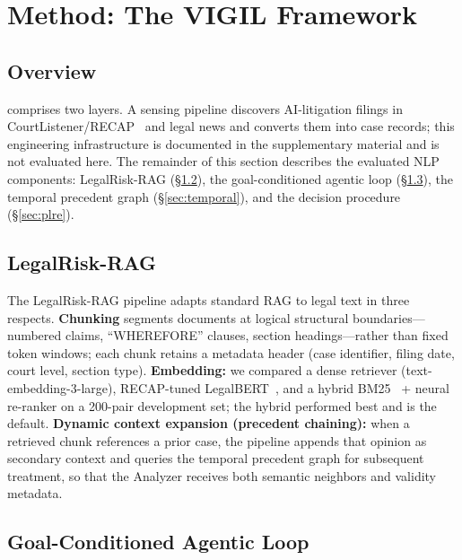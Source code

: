\section{Method: The VIGIL Framework}
\label{sec:method}

\subsection{Overview}
\label{sec:overview}

\sysname{} comprises two layers.
A sensing pipeline discovers AI-litigation filings in CourtListener/RECAP~\citep{courtlistener2023} and legal news and converts them into case records; this engineering infrastructure is documented in the supplementary material and is not evaluated here.
The remainder of this section describes the evaluated NLP components: LegalRisk-RAG (\S\ref{sec:rag}), the goal-conditioned agentic loop (\S\ref{sec:agent}), the temporal precedent graph (\S\ref{sec:temporal}), and the \plre{} decision procedure (\S\ref{sec:plre}).

\subsection{LegalRisk-RAG}
\label{sec:rag}

The LegalRisk-RAG pipeline adapts standard RAG to legal text in three respects.
\textbf{Chunking} segments documents at logical structural boundaries---numbered claims, ``WHEREFORE'' clauses, section headings---rather than fixed token windows; each chunk retains a metadata header (case identifier, filing date, court level, section type).
\textbf{Embedding:} we compared a dense retriever (text-embedding-3-large), RECAP-tuned LegalBERT~\citep{chalkidis2020legalbert}, and a hybrid BM25~\citep{robertson2009bm25} + neural re-ranker on a 200-pair development set; the hybrid performed best and is the default.
\textbf{Dynamic context expansion (precedent chaining):} when a retrieved chunk references a prior case, the pipeline appends that opinion as secondary context and queries the temporal precedent graph for subsequent treatment, so that the Analyzer receives both semantic neighbors and validity metadata.

\subsection{Goal-Conditioned Agentic Loop}
\label{sec:agent}

